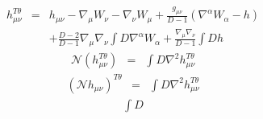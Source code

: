 \documentclass[10pt,letterpaper]{article}
\numberwithin{equation}{section}
\begin{document}
\begin{eqnarray}
h^{T\theta}_{\mu\nu} &=& h_{\mu\nu} - \nabla_\mu W_\nu -\nabla_\nu W_\mu +\frac{g_{\mu\nu}}{D-1}(\nabla^\alpha W_\alpha - h)
\nonumber\\
&&+\frac{D-2}{D-1}\nabla_\mu\nabla_\nu \int D \nabla^\alpha W_\alpha +\frac{\nabla_\mu\nabla_\nu}{D-1}\int D h
\end{eqnarray}
\begin{eqnarray}
\mathcal N (h_{\mu\nu}^{T\theta}) &=& \int D \nabla^2 h_{\mu\nu}^{T\theta}
\end{eqnarray}
\begin{eqnarray}
 (\mathcal N h_{\mu\nu})^{T\theta} &=& \int D \nabla^2 h_{\mu\nu}^{T\theta}
\end{eqnarray}
\begin{eqnarray}
\int D 
\end{eqnarray}
\end{document}
